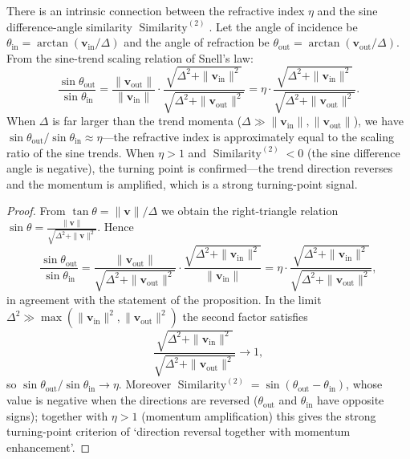 \begin{proposition}\label{prop:refraction_phase}
There is an intrinsic connection between the refractive index $\eta$ and the sine difference-angle similarity $\operatorname{Similarity}^{(2)}$. Let the angle of incidence be $\theta_{\text{in}} = \arctan(\mathbf{v}_{\text{in}}/\Delta)$ and the angle of refraction be $\theta_{\text{out}} = \arctan(\mathbf{v}_{\text{out}}/\Delta)$. From the sine-trend scaling relation of Snell's law:
\[
\frac{\sin\theta_{\text{out}}}{\sin\theta_{\text{in}}} = \frac{\|\mathbf{v}_{\text{out}}\|}{\|\mathbf{v}_{\text{in}}\|} \cdot \frac{\sqrt{\Delta^2 + \|\mathbf{v}_{\text{in}}\|^2}}{\sqrt{\Delta^2 + \|\mathbf{v}_{\text{out}}\|^2}} = \eta \cdot \frac{\sqrt{\Delta^2 + \|\mathbf{v}_{\text{in}}\|^2}}{\sqrt{\Delta^2 + \|\mathbf{v}_{\text{out}}\|^2}}.
\]
When $\Delta$ is far larger than the trend momenta ($\Delta \gg \|\mathbf{v}_{\text{in}}\|, \|\mathbf{v}_{\text{out}}\|$), we have $\sin\theta_{\text{out}}/\sin\theta_{\text{in}} \approx \eta$---the refractive index is approximately equal to the scaling ratio of the sine trends. When $\eta > 1$ and $\operatorname{Similarity}^{(2)} < 0$ (the sine difference angle is negative), the turning point is confirmed---the trend direction reverses and the momentum is amplified, which is a strong turning-point signal.
\end{proposition}

\begin{proof}
From $\tan\theta = \|\mathbf{v}\|/\Delta$ we obtain the right-triangle relation $\sin\theta = \frac{\|\mathbf{v}\|}{\sqrt{\Delta^2 + \|\mathbf{v}\|^2}}$. Hence
\[
\frac{\sin\theta_{\text{out}}}{\sin\theta_{\text{in}}}
= \frac{\|\mathbf{v}_{\text{out}}\|}{\sqrt{\Delta^2 + \|\mathbf{v}_{\text{out}}\|^2}} \cdot \frac{\sqrt{\Delta^2 + \|\mathbf{v}_{\text{in}}\|^2}}{\|\mathbf{v}_{\text{in}}\|}
= \eta \cdot \frac{\sqrt{\Delta^2 + \|\mathbf{v}_{\text{in}}\|^2}}{\sqrt{\Delta^2 + \|\mathbf{v}_{\text{out}}\|^2}},
\]
in agreement with the statement of the proposition. In the limit $\Delta^2 \gg \max(\|\mathbf{v}_{\text{in}}\|^2, \|\mathbf{v}_{\text{out}}\|^2)$ the second factor satisfies
\[
\frac{\sqrt{\Delta^2 + \|\mathbf{v}_{\text{in}}\|^2}}{\sqrt{\Delta^2 + \|\mathbf{v}_{\text{out}}\|^2}} \to 1,
\]
so $\sin\theta_{\text{out}}/\sin\theta_{\text{in}} \to \eta$. Moreover $\operatorname{Similarity}^{(2)} = \sin(\theta_{\text{out}} - \theta_{\text{in}})$, whose value is negative when the directions are reversed ($\theta_{\text{out}}$ and $\theta_{\text{in}}$ have opposite signs); together with $\eta > 1$ (momentum amplification) this gives the strong turning-point criterion of `direction reversal together with momentum enhancement'.
\end{proof}

